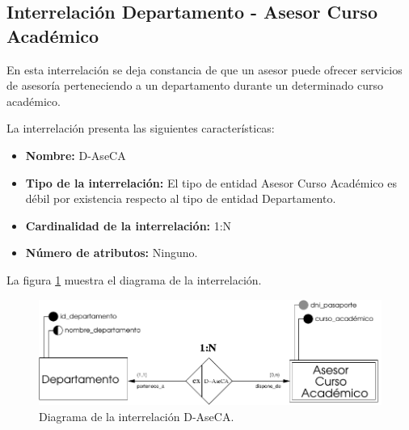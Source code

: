 \subsection{Interrelación Departamento - Asesor Curso Académico}

   \begin{description}
      \item[Definición] En esta interrelación se deja constancia de que un
      asesor puede ofrecer servicios de asesoría perteneciendo a un departamento
      durante un determinado curso académico.

      \item[Características] La interrelación presenta las siguientes
                             características:

         \begin{itemize}
            \item \textbf{Nombre:} D-AseCA
            \item \textbf{Tipo de la interrelación:} El tipo de entidad
                  Asesor Curso Académico es débil por existencia respecto al
                  tipo de entidad Departamento.
            \item \textbf{Cardinalidad de la interrelación:} 1:N
            \item \textbf{Número de atributos:} Ninguno.
         \end{itemize}

      \item[Diagrama] La figura \ref{diagramaD-AseCA} muestra el diagrama de la
                      interrelación.

      \item \begin{figure}[!ht]
            \begin{center}
            \includegraphics[]{07.Modelo_Entidad-Interrelacion/7.3.Analisis_Interrelaciones/diagramas/D-AseCA.pdf}
            \caption{Diagrama de la interrelación D-AseCA.}
            \label{diagramaD-AseCA}
            \end{center}
         \end{figure}


\end{description}
